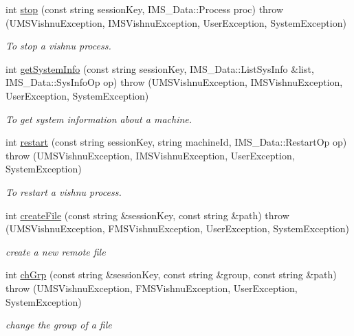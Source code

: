 \begin{DoxyCompactItemize}
int \hyperlink{namespacevishnu_a0a5795c2a88415d758de3a05762850ce}{stop} (const string sessionKey, IMS\_\-Data::Process proc)  throw (UMSVishnuException, IMSVishnuException, UserException, SystemException)
\begin{DoxyCompactList}\small\item\em To stop a vishnu process. \item\end{DoxyCompactList}\item 
int \hyperlink{namespacevishnu_ab6cc46ec3fc97e19d7a57bcf42dee328}{getSystemInfo} (const string sessionKey, IMS\_\-Data::ListSysInfo \&list, IMS\_\-Data::SysInfoOp op)  throw (UMSVishnuException, IMSVishnuException, UserException, SystemException)
\begin{DoxyCompactList}\small\item\em To get system information about a machine. \item\end{DoxyCompactList}\item 
int \hyperlink{namespacevishnu_aa87ea9f13dc0bc74edd73e815c4bdf7c}{restart} (const string sessionKey, string machineId, IMS\_\-Data::RestartOp op)  throw (UMSVishnuException, IMSVishnuException, UserException, SystemException)
\begin{DoxyCompactList}\small\item\em To restart a vishnu process. \item\end{DoxyCompactList}\item 
int \hyperlink{namespacevishnu_a7719eac49c7e537d743d0dbcb4bdb627}{createFile} (const string \&sessionKey, const string \&path)  throw (UMSVishnuException, FMSVishnuException, UserException, SystemException)
\begin{DoxyCompactList}\small\item\em create a new remote file \item\end{DoxyCompactList}\item 
int \hyperlink{namespacevishnu_a1dd41a50658d5aa0cdb4b46a654359e7}{chGrp} (const string \&sessionKey, const string \&group, const string \&path)  throw (UMSVishnuException, FMSVishnuException, UserException, SystemException)
\begin{DoxyCompactList}\small\item\em change the group of a file \item\end{DoxyCompactList}\item 

\end{DoxyCompactItemize}
